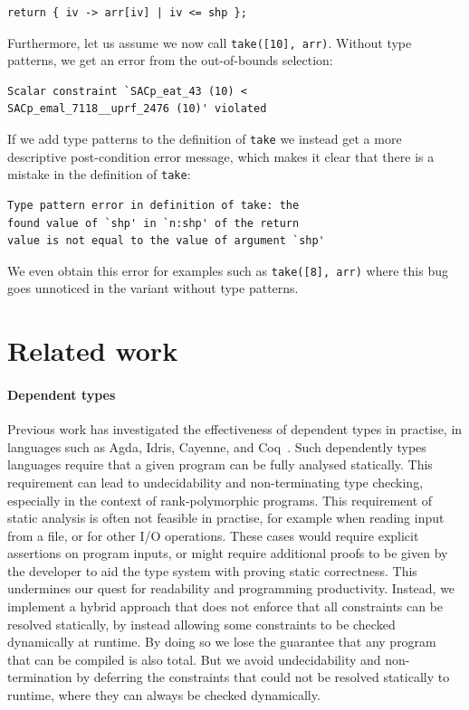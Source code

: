 \documentclass[sigconf,screen]{acmart}
\begin{document}
\begin{lstlisting}
return { iv -> arr[iv] | iv <= shp };
\end{lstlisting}

Furthermore, let us assume we now call \verb|take([10], arr)|.
Without type patterns, we get an error from the out-of-bounds selection:

\begin{lstlisting}[language=console]
Scalar constraint `SACp_eat_43 (10) <
SACp_emal_7118__uprf_2476 (10)' violated
\end{lstlisting}

If we add type patterns to the definition of \texttt{take} we instead get a more descriptive post-condition error message, which makes it clear that there is a mistake in the definition of \texttt{take}:

\begin{lstlisting}[language=console]
Type pattern error in definition of take: the
found value of `shp' in `n:shp' of the return
value is not equal to the value of argument `shp'
\end{lstlisting}

We even obtain this error for examples such as \verb|take([8], arr)| where this bug goes unnoticed in the variant without type patterns.

\section{Related work}
\paragraph*{Dependent types}
Previous work has investigated the effectiveness of dependent types in practise, in languages such as Agda, Idris, Cayenne, and Coq~\cite{agda,idris,cayenne,coq}.
Such dependently types languages require that a given program can be fully analysed statically.
This requirement can lead to undecidability and non-terminating type checking, especially in the context of rank-polymorphic programs.
This requirement of static analysis is often not feasible in practise, for example when reading input from a file, or for other I/O operations.
These cases would require explicit assertions on program inputs, or might require additional proofs to be given by the developer to aid the type system with proving static correctness.
This undermines our quest for readability and programming productivity.
Instead, we implement a hybrid approach that does not enforce that all constraints can be resolved statically, by instead allowing some constraints to be checked dynamically at runtime.
By doing so we lose the guarantee that any program that can be compiled is also total.
But we avoid undecidability and non-termination by deferring the constraints that could not be resolved statically to runtime, where they can always be checked dynamically.
\end{document}
